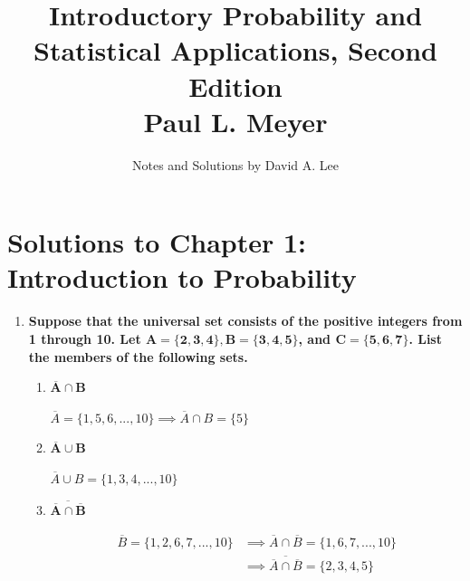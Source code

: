 \documentclass[10pt, oneside]{article}
\title{Introductory Probability and Statistical Applications, Second Edition \\
\large{Paul L. Meyer}}
\author{Notes and Solutions by David A. Lee }
\date{}							%
\begin{document}
\maketitle
\section*{Solutions to Chapter 1: Introduction to Probability}

\begin{enumerate}[label=1.\arabic*]
\itemsep0em 
\item  \begin{tcolorbox}[
  colback=Cerulean!5!white,
  colframe=Cerulean!75!black]
\textbf{Suppose that the universal set consists of the positive integers from 1 through 10. Let $\bm{A = \{ 2, 3, 4 \}, B = \{ 3, 4, 5 \}}$, and $\bm{C = \{ 5, 6, 7 \}}$. List the members of the following sets.}
\end{tcolorbox}

	\begin{enumerate} 
	\item  \begin{tcolorbox}[
	  colback=Cerulean!5!white,
	  colframe=Cerulean!75!black]
	\textbf{$\bm{\overline{A} \cap B}$}
	\end{tcolorbox}
	
	$\overline{A} = \{1, 5, 6, ..., 10 \} \implies \boxed{\overline{A} \cap B = \{ 5 \}}$
	
	\item  \begin{tcolorbox}[
	  colback=Cerulean!5!white,
	  colframe=Cerulean!75!black]
	\textbf{$\bm{\overline{A} \cup B}$}
	\end{tcolorbox}
	
	$\boxed{\overline{A} \cup B = \{ 1, 3, 4, ..., 10 \}}$
	
	\item  \begin{tcolorbox}[
	  colback=Cerulean!5!white,
	  colframe=Cerulean!75!black]
	\textbf{$\bm{\overline{\overline{A} \cap \overline{B}}}$}
	\end{tcolorbox}
	
	\begin{align*}
	\overline{B} = \{ 1, 2, 6, 7, ..., 10 \} &\implies \overline{A} \cap \overline{B} = \{ 1, 6, 7, ..., 10\} \\
	&\implies \boxed{ \overline{\overline{A} \cap \overline{B}} = \{2, 3, 4, 5 \} }
	\end{align*}
	

\end{enumerate}
\end{enumerate}
\end{document}
